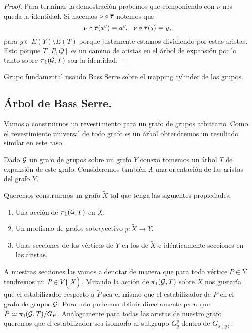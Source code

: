 \documentclass[tesis.tex]{subfiles}
\newcommand{\cG}{ {\cal G} }
\begin{document}
\begin{proof}
	Para terminar la demostración probemos que componiendo con $\nu$ nos queda la identidad.
	Si hacemos $\nu \circ \overline \tau$ notemos que 
	\begin{equation*}
	\nu \circ \overline \tau (a^y) = a^y, \ \ \nu \circ \overline \tau (y) = y, 
	\end{equation*}
	para $y \in E(Y) \setminus E(T)$ porque justamente estamos dividiendo por estas aristas. 
	Esto porque $T[P,Q]$ es un camino de aristas en el árbol de expansión por lo tanto sobre $\pi_1(\cG, T)$ son la identidad.
\end{proof}

\begin{ej}
	Grupo fundamental usando Bass Serre sobre el mapping cylinder de los grupos.
\end{ej}


\subsection{Árbol de Bass Serre.}

Vamos a construirnos un revestimiento para un grafo de grupos arbitrario. 
Como el revestimiento universal de todo grafo es un árbol obtendremos un resultado similar en este caso.

Dado $\cG$ un grafo de grupos sobre un grafo $Y$ conexo tomemos un árbol $T$ de expansión de este grafo.
Consideremos también $A$ una orientación de las aristas del grafo $Y$.

Queremos construirnos un grafo $\tilde X$ tal que tenga las siguientes propiedades:

\begin{enumerate}
	\item Una acción de $\pi_1(\cG, T)$ en $\tilde X$.
	\item Un morfismo de grafos sobreyectivo $p:\tilde X \to Y$. 
	\item Unas secciones de los vértices de $Y$ en los de $\tilde X$ e idénticamente secciones en las aristas.
\end{enumerate}

A nuestras secciones las vamos a denotar de manera que para todo vértice $P \in Y$ tendremos un $ \tilde P \in V(\tilde X)$.
Mirando la acción de $\pi_1(\cG, T)$ sobre $\tilde X$ nos gustaría que el estabilizador respecto a $\tilde P$ sea el mismo que el estabilizador de $P$ en el grafo de grupos $\cG$. 
Para esto podemos definir directamente para que $\tilde P \simeq \pi_1(\cG, T) / G_P$.
Análogamente para todas las aristas de nuestro grafo queremos que el estabilizador sea isomorfo al subgrupo $G^y_y$ dentro de $G_{s(y)}$.
\end{document}
